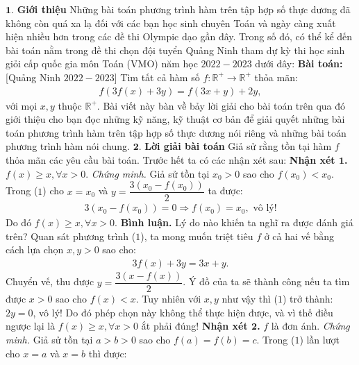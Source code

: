 \begin{multicols}{2}
	$\pmb{1.}$	\textbf{\color{hoccungpi}Giới thiệu}
	\vskip 0.1cm
	Những bài toán phương trình hàm trên tập hợp số thực dương đã không còn quá xa lạ đối với các bạn học sinh chuyên Toán và ngày càng xuất hiện nhiều hơn trong các đề thi Olympic dạo gần đây. Trong số đó, có thể kể đến bài toán nằm trong đề thi chọn đội tuyển Quảng Ninh tham dự kỳ thi học sinh giỏi cấp quốc gia môn Toán (VMO) năm học $2022-2023$ dưới đây: 
	\vskip 0.1cm
	\textbf{\color{hoccungpi}Bài toán:} [Quảng Ninh $2022 - 2023$]
	\vskip 0.1cm
	Tìm tất cả hàm số $f: \mathbb{R^+} \to \mathbb{R^+}$ thỏa mãn: 
	\begin{align*}
		f(3f(x) + 3y) = f(3x + y) + 2y,\tag{$1$}
	\end{align*}
	với mọi $x,y$ thuộc $\mathbb{R^+}$.
	\vskip 0.1cm
	Bài viết này bàn về bảy lời giải cho bài toán trên qua đó giới thiệu cho bạn đọc những kỹ năng, kỹ thuật cơ bản để giải quyết những bài toán phương trình hàm trên tập hợp số thực dương nói riêng và những bài toán phương trình hàm nói chung.
	\vskip 0.1cm
	$\pmb{2.}$	\textbf{\color{hoccungpi}Lời giải bài toán}
	\vskip 0.1cm
	Giả sử rằng tồn tại hàm $f$ thỏa mãn các yêu cầu bài toán. Trước hết ta có các nhận xét sau:
	\vskip 0.1cm
	\textbf{\color{hoccungpi}Nhận xét $\pmb1$.} $f(x) \ge x, \forall x > 0$.
	\vskip 0.1cm   
	\textit{Chứng minh.}  Giả sử tồn tại $x_0 > 0$  sao cho $f(x_0) < x_0$. Trong ($1$) cho $x = x_0$  và  $y = \dfrac{3\left(x_0 -f(x_0)\right)}{2}$ ta được: 
	\begin{align*}
		3({x_0} - f({x_0})) = 0 \Rightarrow f({x_0}) = {x_0}, \text{ vô lý!}
	\end{align*}
	Do đó $f(x) \ge x, \forall x > 0$.
	\vskip 0.1cm  
	\textbf{\color{hoccungpi}Bình luận.}  Lý do nào khiến ta nghĩ ra được đánh giá trên? Quan sát phương trình ($1$), ta mong muốn triệt tiêu $f$  ở cả hai vế bằng cách lựa chọn $x, y > 0$  sao cho: 
	\begin{align*}
		3f(x) + 3y = 3x + y.
	\end{align*}
	Chuyển vế, thu được $y = \dfrac{3\left(x - f(x)\right)}{2}$.  Ý đồ của ta sẽ thành công nếu ta tìm được $x > 0$  sao cho  $f(x) < x$. Tuy nhiên với $x,y$  như vậy thì ($1$) trở thành: $2y = 0$, vô lý! Do đó phép chọn này không thể thực hiện được, và vì thế điều ngược lại là $f(x) \ge x , \forall x > 0$  ắt phải đúng!
	\vskip 0.1cm
	\textbf{\color{hoccungpi}Nhận xét $\pmb2$.} $f$ là đơn ánh.
	\vskip 0.1cm
	\textit{Chứng minh.}  Giả sử tồn tại $a > b > 0$  sao cho $f(a) = f(b) = c$.  Trong ($1$) lần lượt cho $x = a $ và $x = b$  thì được: 

\end{multicols}
